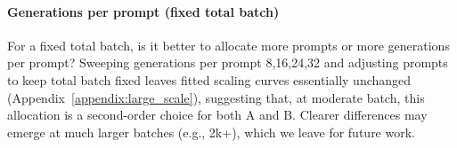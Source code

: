 \paragraph{Generations per prompt (fixed total batch)}
For a fixed total batch, is it better to allocate more prompts or more generations per prompt? Sweeping generations per prompt {8,16,24,32} and adjusting prompts to keep total batch fixed leaves fitted scaling curves essentially unchanged (Appendix~\ref{appendix:large_scale}), suggesting that, at moderate batch, this allocation is a second-order choice for both A and B. Clearer differences may emerge at much larger batches (e.g., 2k+), which we leave for future work. 



